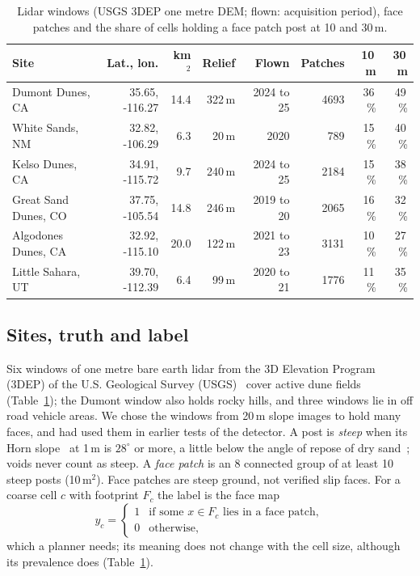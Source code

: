 \documentclass[conference]{IEEEtran}
\begin{document}
\begin{table}[t]
\caption{Lidar windows (USGS 3DEP one metre DEM; flown: acquisition period), face patches and the share of cells holding a face patch post at 10 and 30\,m.}
\label{tab:sites}
\centering\scriptsize
\setlength{\tabcolsep}{2.6pt}
\begin{tabular}{@{}lrrrrrrr@{}}
\toprule
Site & Lat., lon. & km$^2$ & Relief & Flown & Patches & 10\,m & 30\,m \\
\midrule
Dumont Dunes, CA & 35.65, -116.27 & 14.4 & 322\,m & 2024 to 25 & 4693 & 36\,\% & 49\,\% \\
White Sands, NM & 32.82, -106.29 & 6.3 & 20\,m & 2020 & 789 & 15\,\% & 40\,\% \\
Kelso Dunes, CA & 34.91, -115.72 & 9.7 & 240\,m & 2024 to 25 & 2184 & 15\,\% & 38\,\% \\
Great Sand Dunes, CO & 37.75, -105.54 & 14.8 & 246\,m & 2019 to 20 & 2065 & 16\,\% & 32\,\% \\
Algodones Dunes, CA & 32.92, -115.10 & 20.0 & 122\,m & 2021 to 23 & 3131 & 10\,\% & 27\,\% \\
Little Sahara, UT & 39.70, -112.39 & 6.4 & 99\,m & 2020 to 21 & 1776 & 11\,\% & 35\,\% \\
\bottomrule
\end{tabular}
\end{table}

\subsection{Sites, truth and label}
Six windows of one metre bare earth lidar from the 3D Elevation Program (3DEP) of the U.S. Geological Survey (USGS)~\cite{sugarbaker2014} cover active dune fields (Table~\ref{tab:sites}); the Dumont window also holds rocky hills, and three windows lie in off road vehicle areas. We chose the windows from 20\,m slope images to hold many faces, and had used them in earlier tests of the detector. A post is \emph{steep} when its Horn slope~\cite{horn1981} at 1\,m is $28^\circ$ or more, a little below the angle of repose of dry sand~\cite{pye2009}; voids never count as steep. A \emph{face patch} is an 8 connected group of at least 10 steep posts (10\,m$^2$). Face patches are steep ground, not verified slip faces. For a coarse cell $c$ with footprint $F_c$ the label is the face map
\begin{equation}
y_c = \begin{cases}1 & \text{if some } x \in F_c \text{ lies in a face patch},\\ 0 & \text{otherwise,}\end{cases}
\label{eq:label}
\end{equation}
which a planner needs; its meaning does not change with the cell size, although its prevalence does (Table~\ref{tab:sites}).
\end{document}
